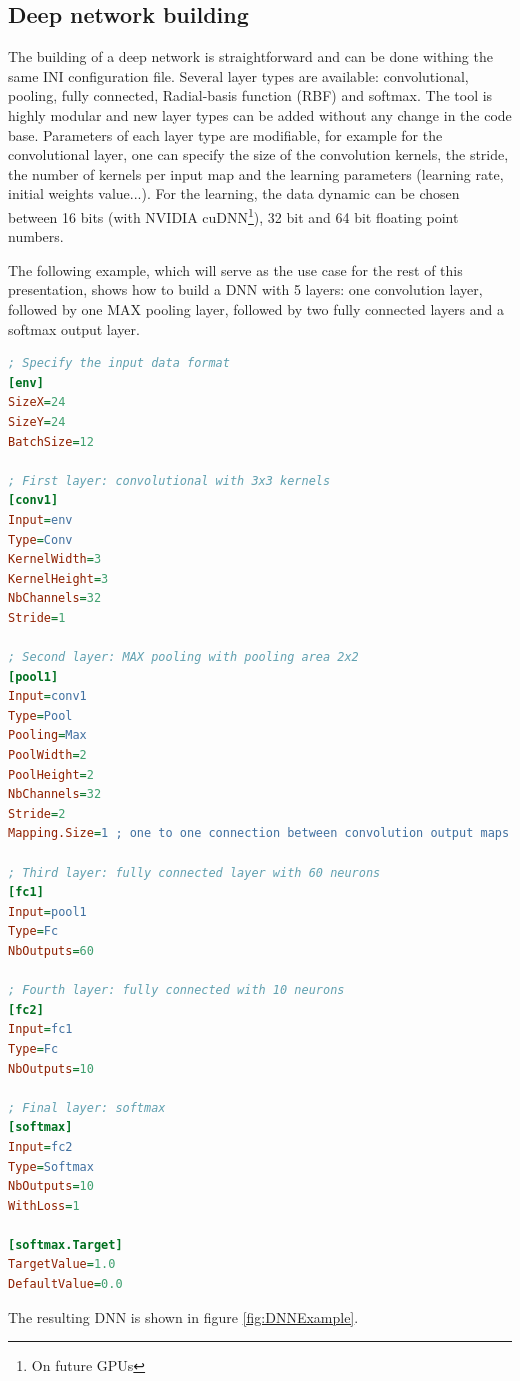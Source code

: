 \documentclass[a4paper,11pt,oneside]{article}
\begin{document}
\subsection{Deep network building}

The building of a deep network is straightforward and can be done withing the
same INI configuration file. Several layer types are available: convolutional,
pooling, fully connected, Radial-basis function (RBF) and softmax. The tool is
 highly modular and new layer types can be added without any change in the code
  base.
Parameters of each layer type are modifiable, for example for the convolutional
 layer, one can specify the size of the convolution kernels, the stride,
 the number of kernels per input map and the learning parameters (learning rate,
  initial weights value...).
For the learning, the data dynamic can be chosen between 16 bits (with
 NVIDIA\textregistered{} cuDNN\footnote{On future GPUs}), 32 bit and 64 bit
  floating point numbers.

The following example, which will serve as the use case for the rest of this
 presentation, shows how to build a DNN with 5 layers: one convolution layer,
  followed by one MAX pooling layer, followed by two fully connected layers
  and a softmax output layer.

\begin{lstlisting}[language=ini]
; Specify the input data format
[env]
SizeX=24
SizeY=24
BatchSize=12

; First layer: convolutional with 3x3 kernels
[conv1]
Input=env
Type=Conv
KernelWidth=3
KernelHeight=3
NbChannels=32
Stride=1

; Second layer: MAX pooling with pooling area 2x2
[pool1]
Input=conv1
Type=Pool
Pooling=Max
PoolWidth=2
PoolHeight=2
NbChannels=32
Stride=2
Mapping.Size=1 ; one to one connection between convolution output maps and pooling input maps

; Third layer: fully connected layer with 60 neurons
[fc1]
Input=pool1
Type=Fc
NbOutputs=60

; Fourth layer: fully connected with 10 neurons
[fc2]
Input=fc1
Type=Fc
NbOutputs=10

; Final layer: softmax
[softmax]
Input=fc2
Type=Softmax
NbOutputs=10
WithLoss=1

[softmax.Target]
TargetValue=1.0
DefaultValue=0.0
\end{lstlisting}

The resulting DNN is shown in figure \ref{fig:DNNExample}.
\end{document}
